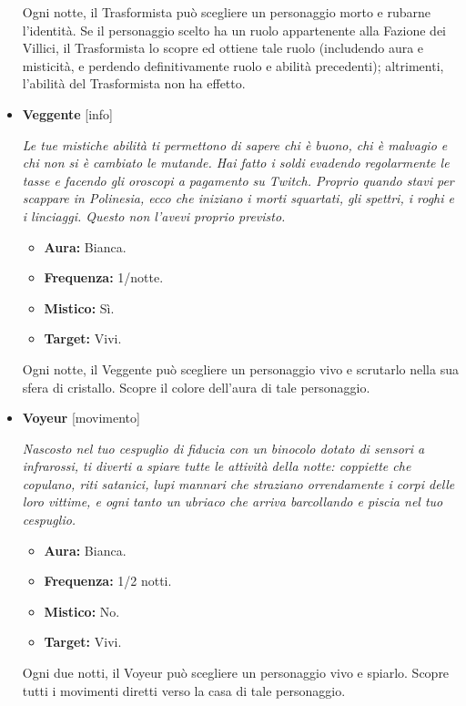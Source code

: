 \documentclass[a4paper,10pt]{article}
\begin{document}
\begin{itemize}
            Ogni notte, il Trasformista può scegliere un personaggio morto e rubarne l'identità. Se il personaggio scelto ha un ruolo appartenente alla Fazione dei Villici, il Trasformista lo scopre ed ottiene tale ruolo (includendo aura e misticità, e perdendo definitivamente ruolo e abilità precedenti); altrimenti, l'abilità del Trasformista non ha effetto.

      \item \textbf{Veggente} [info]

            \emph{Le tue mistiche abilità ti permettono di sapere chi è buono, chi è malvagio e chi non si è cambiato le mutande. Hai fatto i soldi evadendo regolarmente le tasse e facendo gli oroscopi a pagamento su Twitch. Proprio quando stavi per scappare in Polinesia, ecco che iniziano i morti squartati, gli spettri, i roghi e i linciaggi. Questo non l'avevi proprio previsto.}

            \begin{multicols}{2}
                  \begin{itemize}
                        \item \textbf{Aura:} Bianca.
                        \item \textbf{Frequenza:} 1/notte.
                        \item \textbf{Mistico:} Sì.
                        \item \textbf{Target:} Vivi.
                  \end{itemize}
            \end{multicols}

            Ogni notte, il Veggente può scegliere un personaggio vivo e scrutarlo nella sua sfera di cristallo. Scopre il colore dell'aura di tale personaggio.

      \item \textbf{Voyeur} [movimento]

            \emph{Nascosto nel tuo cespuglio di fiducia con un binocolo dotato di sensori a infrarossi, ti diverti a spiare tutte le attività della notte: coppiette che copulano, riti satanici, lupi mannari che straziano orrendamente i corpi delle loro vittime, e ogni tanto un ubriaco che arriva barcollando e piscia nel tuo cespuglio.}

            \begin{multicols}{2}
                  \begin{itemize}
                        \item \textbf{Aura:} Bianca.
                        \item \textbf{Frequenza:} 1/2 notti.
                        \item \textbf{Mistico:} No.
                        \item \textbf{Target:} Vivi.
                  \end{itemize}
            \end{multicols}

            Ogni due notti, il Voyeur può scegliere un personaggio vivo e spiarlo. Scopre tutti i movimenti diretti verso la casa di tale personaggio.

\end{itemize}
\end{document}
